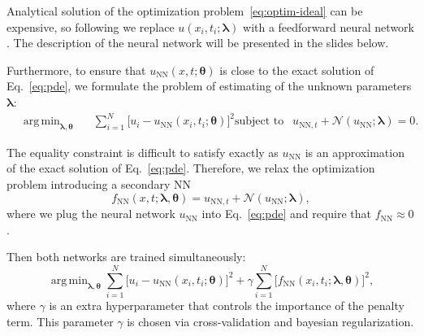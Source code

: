 \documentclass{beamer}
\def\\{}%
\renewcommand{\vec}[1]{\boldsymbol{#1}}
\newcommand{\VTheta}{\ensuremath{\vec{\theta}}}
\newcommand{\VLambda}{\ensuremath{\vec{\lambda}}}
\DeclareMathOperator*{\argmin}{arg\,min}
\newcommand{\UNN}[1][\text{NN}]{u_{#1}}
\newcommand{\FNN}[1][\text{NN}]{f_{#1}}
\newcommand{\NonlinOp}{\mathcal N\!}
\begin{document}
\begin{frame}

Analytical solution of the optimization problem~\eqref{eq:optim-ideal} can be expensive, so following \cite{raissi2017pinnII}
we replace  $u(x_i, t_i; \VLambda)$ with a 
feedforward neural network \cite{goodfellow2016deep}. The description of the neural network will be presented in the slides below.

Furthermore, to ensure that $\UNN( x, t; \VTheta)$
is close to the exact solution of Eq.~\eqref{eq:pde}, we formulate the problem of estimating of the unknown parameters
$\VLambda$:
\begin{subequations}
\label{eq:optim}
\begin{align*}
    &\argmin_{\VLambda, \VTheta} \quad \ \ 
        \sum_{i=1}^N \big[u_i - \UNN(x_i, t_i; \VTheta)\big]^2  \\
    &\text{subject to } \ \ \UNN[\text{NN}, t]  + \NonlinOp(\UNN; \VLambda) = 0.
\end{align*}
\end{subequations}

\end{frame}

\begin{frame}
The equality constraint is difficult to satisfy exactly as
$u_{\text{NN}}$ is an approximation of the exact solution of
Eq.~\eqref{eq:pde}.
Therefore, we relax the optimization problem introducing a secondary NN
\begin{equation*}
    \FNN(x, t; \VLambda, \VTheta) =
        u_{\text{NN}, t} + \NonlinOp(u_{\text{NN}}; \VLambda),
\end{equation*}
where we plug the neural network $\UNN$ into Eq.~\eqref{eq:pde} and
require that $\FNN \approx 0$.

Then both networks are trained simultaneously:
\begin{equation*}
    \argmin_{\VLambda, \VTheta}
    \sum_{i=1}^N \big[ u_i - \UNN(x_i, t_i; \VTheta)\big ]^2
    +\gamma \sum_{i=1}^N \big[ \FNN(x_i, t_i; \VLambda, \VTheta) \big]^2,
\end{equation*}
where $\gamma$ is an extra hyperparameter that controls the importance of the
penalty term.
This parameter $\gamma$ is chosen via cross-validation and bayesian regularization.
    
\end{frame}
\end{document}
